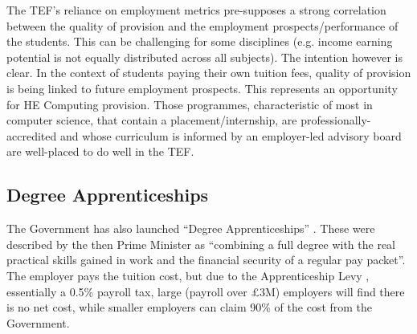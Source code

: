 \documentclass[sigconf,anonymous]{acmart}
\begin{document}

The TEF's reliance on employment metrics pre-supposes a strong
correlation between the quality of provision and the employment
prospects/performance of the students. This can be challenging for
some disciplines (e.g. income earning potential is not equally
distributed across all subjects). The intention however is clear. In
the context of students paying their own tuition fees, quality of
provision is being linked to future employment prospects. This
represents an opportunity for HE Computing provision. Those
programmes, characteristic of most in computer science, that contain a
placement/internship, are professionally-accredited and whose
curriculum is informed by an employer-led advisory board are
well-placed to do well in the TEF.

\subsection{Degree Apprenticeships}\label{sec:DA}

The Government has also launched ``Degree Apprenticeships''
\cite{BIS2015a}. These were described by the then Prime Minister as
``combining a full degree with the real practical skills gained in
work and the financial security of a regular pay packet''. The
employer pays the tuition cost, but due to the Apprenticeship Levy
\cite{HMRC2016a}, essentially a 0.5\% payroll tax, large (payroll over
\pounds3M) employers will find there is no net cost, while smaller
employers can claim 90\% of the cost from the Government.
\end{document}
